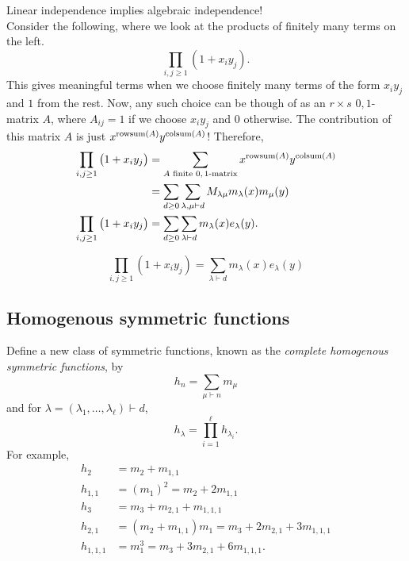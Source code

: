 	Linear independence implies algebraic independence!\\

	Consider the following, where we look at the products of finitely many terms on the left.
	\[ \prod_{i,j \ge 1} \left( 1 + x_iy_j \right). \]
	This gives meaningful terms when we choose finitely many terms of the form $x_iy_j$ and $1$ from the rest. Now, any such choice can be though of as an $r \times s$ $0,1$-matrix $A$, where $A_{ij} = 1$ if we choose $x_i y_j$ and $0$ otherwise. The contribution of this matrix $A$ is just $x^{\operatorname{rowsum}(A)} y^{\operatorname{colsum}(A)}$! Therefore,
	\begin{align}
		\prod_{i,j \ge 1} \left( 1 + x_i y_j \right) &= \sum_{\text{$A$ finite $0,1$-matrix}} x^{\operatorname{rowsum}(A)} y^{\operatorname{colsum}(A)} \nonumber \\
			&= \sum_{d \ge 0} \sum_{\lambda,\mu \vdash d} M_{\lambda\mu} m_\lambda(x) m_\mu(y) \nonumber \\
		\prod_{i,j \ge 1} \left(1 + x_iy_j\right)  &= \sum_{d \ge 0} \sum_{\lambda \vdash d} m_\lambda(x) e_\lambda(y).
	\end{align}

	\begin{prop}
		\label{eqn: prod 1 p xi yj}
		\[ \prod_{i,j \ge 1} (1+x_iy_j) = \sum_{\lambda \vdash d} m_\lambda(x) e_\lambda(y) \]
	\end{prop}

\subsection{Homogenous symmetric functions}

	Define a new class of symmetric functions, known as the \emph{complete homogenous symmetric functions}, by
	\[ h_n = \sum_{\mu \vdash n} m_\mu \]
	and for $\lambda = (\lambda_1,\ldots,\lambda_\ell) \vdash d$,
	\[ h_\lambda = \prod_{i=1}^{\ell} h_{\lambda_i}. \]
	For example,
	\begin{align*}
		h_2 &= m_2 + m_{1,1} \\
		h_{1,1} &= (m_1)^2 = m_2 + 2m_{1,1} \\
		h_3 &= m_3 + m_{2,1} + m_{1,1,1} \\
		h_{2,1} &= (m_2 + m_{1,1}) m_1 = m_3 + 2m_{2,1} + 3m_{1,1,1} \\
		h_{1,1,1} &= m_1^3 = m_3 + 3m_{2,1} + 6m_{1,1,1}.
	\end{align*}

